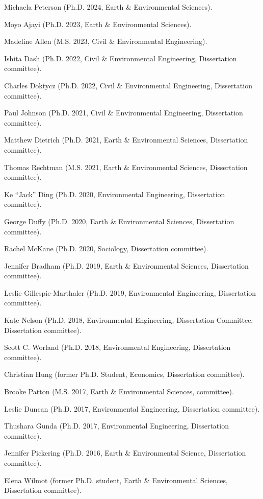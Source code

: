 \item Michaela Peterson (Ph.D. 2024, Earth \& Environmental Sciences).
\item Moyo Ajayi (Ph.D. 2023, Earth \& Environmental Sciences).
\item Madeline Allen (M.S. 2023, Civil \& Environmental Engineering).
\item Ishita Dash (Ph.D. 2022, Civil \& Environmental Engineering, Dissertation committee).
\item Charles Doktycz (Ph.D. 2022, Civil \& Environmental Engineering, Dissertation committee).
\item Paul Johnson (Ph.D. 2021, Civil \& Environmental Engineering, Dissertation committee).
\item Matthew Dietrich (Ph.D. 2021, Earth \& Environmental Sciences, Dissertation committee).
\item Thomas Rechtman (M.S. 2021, Earth \& Environmental Sciences, Dissertation committee).
\item Ke ``Jack'' Ding (Ph.D. 2020, Environmental Engineering, Dissertation committee).
\item George Duffy (Ph.D. 2020, Earth \& Environmental Sciences, Dissertation committee).
\item Rachel McKane (Ph.D. 2020, Sociology, Dissertation committee).
\item Jennifer Bradham (Ph.D. 2019, Earth \& Environmental Sciences, Dissertation committee).
\item Leslie Gillespie-Marthaler (Ph.D. 2019, Environmental Engineering, Dissertation committee).
\item Kate Nelson (Ph.D. 2018, Environmental Engineering, Dissertation Committee, Dissertation committee).
\item Scott C. Worland (Ph.D. 2018, Environmental Engineering, Dissertation committee).
\item Christian Hung (former Ph.D. Student, Economics, Dissertation committee).
\item Brooke Patton (M.S. 2017, Earth \& Environmental Sciences, committee).
\item Leslie Duncan (Ph.D. 2017, Environmental Engineering, Dissertation committee).
\item Thushara Gunda (Ph.D. 2017, Environmental Engineering, Dissertation committee).
\item Jennifer Pickering (Ph.D. 2016, Earth \& Environmental Science, Dissertation committee).
\item Elena Wilmot (former Ph.D. student, Earth \& Environmental Sciences, Dissertation committee).
